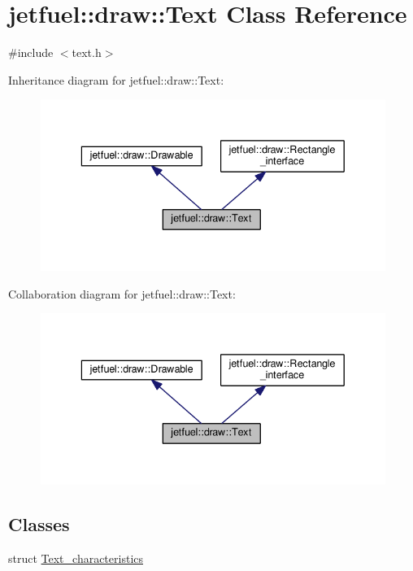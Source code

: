 \hypertarget{classjetfuel_1_1draw_1_1Text}{}\section{jetfuel\+:\+:draw\+:\+:Text Class Reference}
\label{classjetfuel_1_1draw_1_1Text}


{\ttfamily \#include $<$text.\+h$>$}



Inheritance diagram for jetfuel\+:\+:draw\+:\+:Text\+:
\nopagebreak
\begin{figure}[H]
\begin{center}
\leavevmode
\includegraphics[width=336pt]{classjetfuel_1_1draw_1_1Text__inherit__graph}
\end{center}
\end{figure}


Collaboration diagram for jetfuel\+:\+:draw\+:\+:Text\+:
\nopagebreak
\begin{figure}[H]
\begin{center}
\leavevmode
\includegraphics[width=336pt]{classjetfuel_1_1draw_1_1Text__coll__graph}
\end{center}
\end{figure}
\subsection*{Classes}
\begin{DoxyCompactItemize}
\item 
struct \hyperlink{structjetfuel_1_1draw_1_1Text_1_1Text__characteristics}{Text\+\_\+characteristics}
\end{DoxyCompactItemize}
